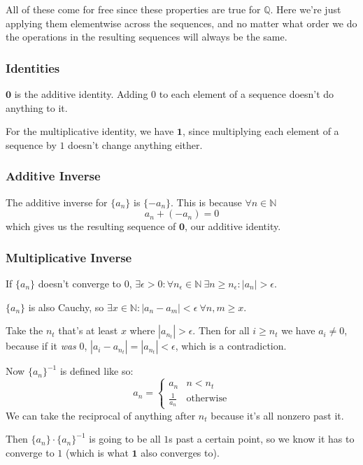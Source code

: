 \documentclass[12pt]{article}
\newcommand{\N}{\mathbb{N}}
\newcommand{\Q}{\mathbb{Q}}
\begin{document}
All of these come for free since these properties are true for $\Q$.
Here we're just applying them elementwise across the sequences,
and no matter what order we do the operations in the resulting sequences
will always be the same.

\subsubsection{Identities}

$\mathbf{0}$ is the additive identity.
Adding $0$ to each element of a sequence doesn't do anything to it.

For the multiplicative identity, we have $\mathbf{1}$,
since multiplying each element of a sequence by $1$ doesn't change anything either.

\subsubsection{Additive Inverse}

The additive inverse for $\{a_n\}$ is $\{-a_n\}$.
This is because $\forall n \in \N$
\[a_n + (-a_n) = 0\]
which gives us the resulting sequence of $\mathbf{0}$, our additive identity.

\subsubsection{Multiplicative Inverse}

If $\{a_n\}$ doesn't converge to $0$,
$\exists \epsilon > 0: \forall n_\epsilon \in \N\ \exists n \ge n_\epsilon: |a_n| > \epsilon$.

$\{a_n\}$ is also Cauchy, so $\exists x \in \N: |a_n-a_m| < \epsilon\ \forall n, m \ge x$.

Take the $n_t$ that's at least $x$ where $|a_{n_t}| > \epsilon$.
Then for all $i \ge n_t$ we have $a_i \ne 0$,
because if it \textit{was} $0$, $|a_i-a_{n_t}| = |a_{n_t}| < \epsilon$, which is a contradiction.

Now $\{a_n\}^{-1}$ is defined like so:
\[a_n = \begin{cases}
    a_n           & n < n_t          \\
    \frac{1}{a_n} & \text{otherwise}
  \end{cases}\]
We can take the reciprocal of anything after $n_t$ because it's all nonzero past it.

Then $\{a_n\} \cdot \{a_n\}^{-1}$ is going to be all $1$s past a certain point,
so we know it has to converge to $1$ (which is what $\mathbf{1}$ also converges to).
\end{document}

